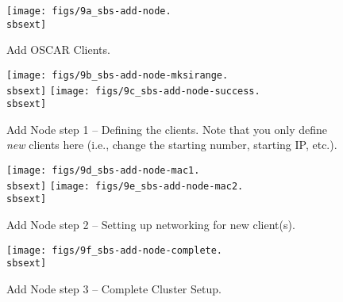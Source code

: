\begin{figure}[h!]
  \begin{center}
    \centerline{\texttt{[image: figs/9a\_sbs-add-node.\\sbsext]}}
    \caption{Add OSCAR Clients.}
    \label{fig:sbs-add-node1}
  \end{center}
\end{figure}

\begin{figure}[h!]
  \begin{center}
    \centerline{
      \texttt{[image: figs/9b\_sbs-add-node-mksirange.\\sbsext]}
      \hspace{\imghskip}
      \texttt{[image: figs/9c\_sbs-add-node-success.\\sbsext]}
      }
    \caption[Add Node step 1 -- Defining the clients.]{Add Node step 1
      -- Defining the clients.  Note that you only define {\em new}
      clients here (i.e., change the starting number, starting IP,
      etc.).}
    \label{fig:sbs-add-node1-define-clients}
  \end{center}
\end{figure}

\begin{figure}[h!]
  \begin{center}
    \centerline{
      \texttt{[image: figs/9d\_sbs-add-node-mac1.\\sbsext]}
      \hspace{\imghskip}
      \texttt{[image: figs/9e\_sbs-add-node-mac2.\\sbsext]}
      }
    \caption{Add Node step 2 -- Setting up networking for new client(s).}
    \label{fig:sbs-add-node1-setup-network}
  \end{center}
\end{figure}

\begin{figure}[h!]
  \begin{center}
    \centerline{\texttt{[image: figs/9f\_sbs-add-node-complete.\\sbsext]}}
    \caption{Add Node step 3 -- Complete Cluster Setup.}
    \label{fig:sbs-add-node1-cluster-setup}
  \end{center}
\end{figure}

